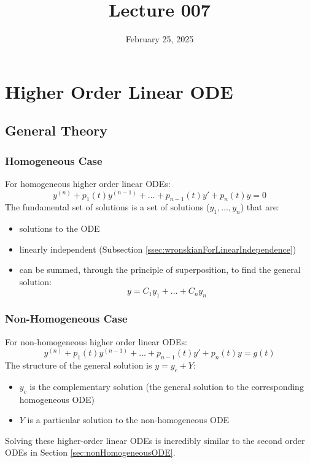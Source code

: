 \documentclass[12pt]{article}
\title{Lecture 007}
\date{February 25, 2025}
\begin{document}
\newpage
\section{Higher Order Linear ODE}
\label{sec:higherOrderLinearODE}

\subsection{General Theory}
\label{ssec:generalTheory}

\subsubsection{Homogeneous Case}
\label{sssec:homogeneousCase}

For homogeneous higher order linear ODEs:
\begin{equation*}
  y^{(n)} + p_1(t)y^{(n-1)} + \hdots + p_{n-1}(t)y' + p_n(t)y = 0
\end{equation*}
The fundamental set of solutions is a set of solutions ($y_1, \hdots, y_n$) that are:
\begin{itemize}
  \itemsep0em
  \item solutions to the ODE
  \item linearly independent (Subsection \ref{ssec:wronskianForLinearIndependence})
  \item can be summed, through the principle of superposition, to find the general solution:
    \begin{equation*}
      y = C_1y_1 + \hdots + C_ny_n
    \end{equation*}
\end{itemize}

\subsubsection{Non-Homogeneous Case}
\label{sssec:nonHomogeneousCase}

For non-homogeneous higher order linear ODEs:
\begin{equation*}
  y^{(n)} + p_1(t)y^{(n-1)} + \hdots + p_{n-1}(t)y' + p_n(t)y = g(t)
\end{equation*}
The structure of the general solution is $y = y_c + Y$:
\begin{itemize}
  \itemsep0em
  \item $y_c$ is the complementary solution (the general solution to the corresponding homogeneous ODE)
  \item $Y$ is a particular solution to the non-homogeneous ODE
\end{itemize}
Solving these higher-order linear ODEs is incredibly similar to the second order ODEs in Section \ref{sec:nonHomogeneousODE}.
\end{document}
